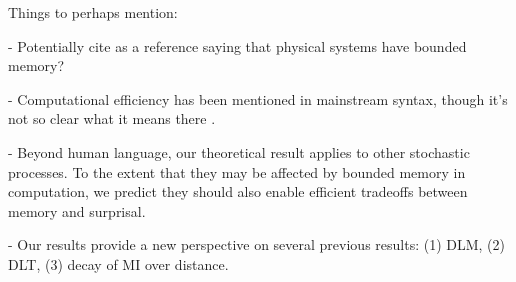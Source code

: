 \documentclass[11pt,letterpaper]{article}
\begin{document}
Things to perhaps mention:

- Potentially cite \cite{PhysRevLett.115.098701} as a reference saying that physical systems have bounded memory?

- Computational efficiency has been mentioned in mainstream syntax, though it's not so clear what it means there \citep{chomsky2005three,hauser2002faculty}.

- Beyond human language, our theoretical result applies to other stochastic processes. To the extent that they may be affected by bounded memory in computation, we predict they should also enable efficient tradeoffs between memory and surprisal.

- Our results provide a new perspective on several previous results: (1) DLM, (2) DLT, (3) decay of MI over distance.


%
%
%
%
%
\end{document}
